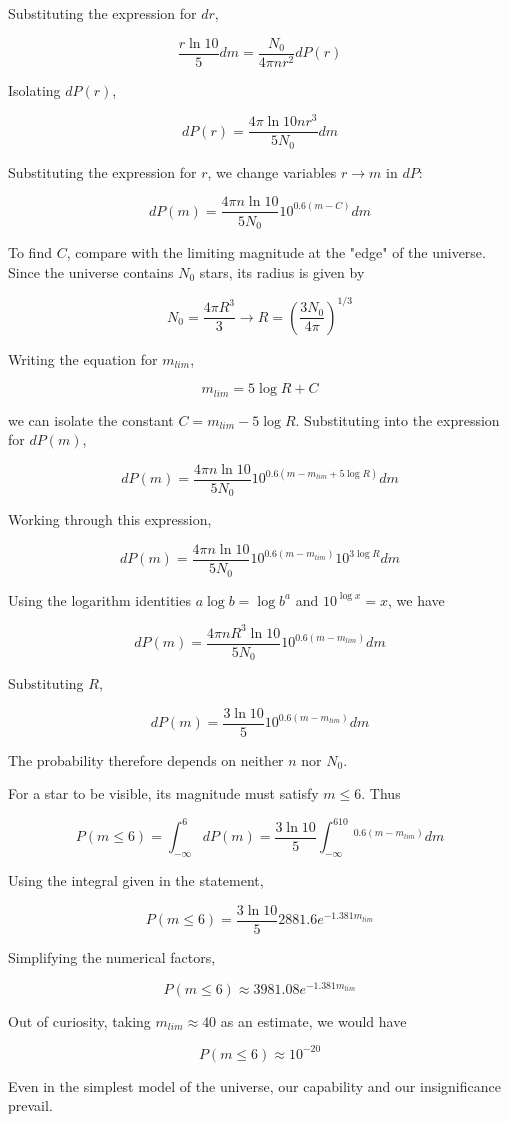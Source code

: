 \documentclass[11pt]{article}
\begin{document}
\begin{pproblem}
\begin{pssolution*}{}{}
\begin{alternativas}
    Substituting the expression for \(dr\),

    \[\frac{r\ln 10}{5}dm = \frac{N_0}{4\pi n r^2}dP(r)\]

    Isolating \(dP(r)\),

    \[dP(r) = \frac{4\pi \ln 10 n r^3}{5 N_0}dm\]

    Substituting the expression for \(r\), we change variables \(r\rightarrow m\) in \(dP\):

    \[dP(m) = \frac{4\pi n \ln 10  }{5 N_0}10^{0.6(m-C)}dm\]

    To find \(C\), compare with the limiting magnitude at the "edge" of the universe. Since the universe contains \(N_0\) stars, its radius is given by

    \[N_0 = \frac{4\pi R^3}{3} \rightarrow R = \left(\frac{3N_0}{4\pi}\right)^{1/3}\]

    Writing the equation for \(m_{lim}\),
    
    \[m_{lim} = 5\log R + C\]

    we can isolate the constant \(C = m_{lim}-5\log R\). Substituting into the expression for \(dP(m)\),

    \[dP(m) = \frac{4\pi n \ln 10  }{5 N_0}10^{0.6(m-m_{lim}+5\log R)}dm\]

    Working through this expression,

    \[dP(m) = \frac{4\pi n \ln 10  }{5 N_0}10^{0.6(m-m_{lim})}10^{3\log R}dm\]

    Using the logarithm identities \(a\log b = \log b^a\) and \(10^{\log x} = x\), we have

    \[dP(m) = \frac{4\pi n R^3\ln 10}{5N_0}10^{0.6(m-m_{lim})}dm\]

    Substituting \(R\),

    \[\boxed{dP(m) = \frac{3\ln 10}{5}10^{0.6(m-m_{lim})}dm}\]

    The probability therefore depends on neither \(n\) nor \(N_0\).

    \item For a star to be visible, its magnitude must satisfy \(m\leq 6\). Thus
    
    \[P(m\leq 6) = \int_{-\infty}^6 dP(m) = \frac{3\ln 10}{5}\int_{-\infty}^610^{0.6(m-m_{lim})}dm\]

    Using the integral given in the statement,

    \[P(m\leq 6) = \frac{3\ln 10}{5}2881.6 e^{-1.381 m_{lim}}\]

    Simplifying the numerical factors,

    \[\boxed{P(m\leq 6) \approx 3981.08 e^{-1.381 m_{lim}}} \]

    Out of curiosity, taking \(m_{lim}\approx 40\) as an estimate, we would have

    \[P(m\leq 6)\approx 10^{-20}\]

    Even in the simplest model of the universe, our capability and our insignificance prevail.
    \end{alternativas}

\end{pssolution*}
\end{pproblem}
\end{document}
